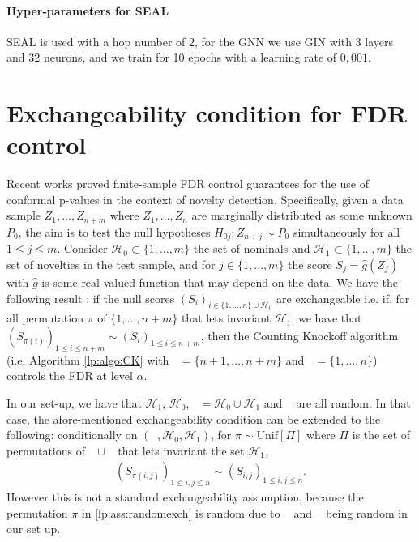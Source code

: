 \documentclass[a4paper, 11pt]{article}
\theoremstyle{remark}
\DeclareMathOperator{\Dtr}{\cD_{\text{train}}}
\DeclareMathOperator{\Dcal}{\cD_{\text{cal}}}
\DeclareMathOperator{\Dtest}{\cD_{\text{test}}}
\newcommand{\EM}{\ensuremath}
\newcommand{\cD}{\EM{\mathcal{D}}}
\newcommand{\cH}{\EM{\mathcal{H}}}
\begin{document}
\paragraph{Hyper-parameters for SEAL} SEAL \citep{zhang2018link} is used with a hop number of $2$, for the GNN we use GIN \citep{xu2018powerful} with 3 layers and 32 neurons, and we train for 10 epochs with a learning rate of $0,001$. 

\section{Exchangeability condition for FDR control} \label{lp:app:exch}

Recent works \citep{bates2023testing, mary2022semi, marandon22b} proved finite-sample FDR control guarantees for the use of conformal p-values in the context of novelty detection. Specifically, given a data sample $Z_1, \dots, Z_{n+m}$ where $Z_1, \dots, Z_n$ are marginally distributed as some unknown $P_0$, the aim is to test the null hypotheses $H_{0j}: Z_{n+j} \sim P_0$ simultaneously for all $1 \leq j \leq m$. Consider $\cH_0 \subset \{1, \dots, m \}$ the set of nominals and $\cH_1 \subset \{1, \dots, m \}$ the set of novelties in the test sample, and for $j \in \{1, \dots, m\}$ the score $S_j = \hat g(Z_j)$ with $\hat g$ is some real-valued function that may depend on the data. We have the following result \citep{weinstein2017power, mary2022semi, marandon22b}: if the null scores $(S_i)_{i \in \{1, \dots, n\} \cup \cH_0 }$ are exchangeable i.e. if, for all permutation $\pi$ of $\{1, \dots, n+m \}$ that lets invariant $\cH_1$, we have that $(S_{\pi(i)})_{1 \leq i \leq n+m} \sim (S_{i})_{1 \leq i \leq n+m}$, then the Counting Knockoff algorithm \citep{weinstein2017power} (i.e. Algorithm \ref{lp:algo:CK} with $\Dtest = \{n+1, \dots, n+m\}$ and $\Dcal = \{1, \dots, n \}$) controls the FDR at level $\alpha$. 

In our set-up, we have that $\cH_1$, $\cH_0$, $\Dtest = \cH_0 \cup \cH_1$ and $\Dcal$ are all random. In that case, the afore-mentioned exchangeability condition can be extended to the following: conditionally on $(\Dcal, \cH_0, \cH_1)$, for $\pi \sim \text{Unif}[\Pi]$ where $\Pi$ is the set of permutations of $\Dcal \cup \Dtest$ that lets invariant the set $\cH_1$, 
\begin{align} \label{lp:ass:randomexch}
(S_{\pi(i,j)})_{1 \leq i,j \leq n} \sim (S_{i,j})_{1 \leq i,j \leq n} .
\end{align}
However this is not a standard exchangeability assumption, because the permutation $\pi$ in \eqref{lp:ass:randomexch} is random due to $\Dtr$ and $\Dtest$ being random in our set up. 
\end{document}
